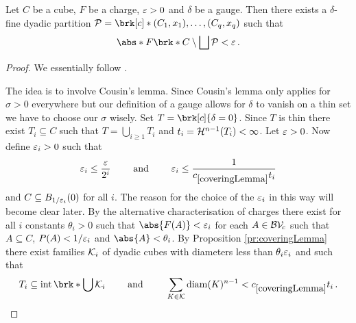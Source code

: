 \begin{lemma}\label{le:DisjointCube}
Let $C$ be a cube, $F$ be a charge, $\varepsilon>0$ and $\delta$ be a gauge. Then there exists a $\delta$-fine dyadic partition $\cP=\brk[c]*{(C_1,x_1),\dots,(C_q,x_q)}$ such that
\begin{align*}
	\abs*{F\brk*{C\setminus\bigsqcup\cP}}<\e\,.
\end{align*}
\end{lemma}
\begin{proof}

We essentially follow \cite[Lemma 2.6.4]{Pfe2001}.

The idea is to involve Cousin's lemma. Since Cousin's lemma only applies for $\sigma>0$ everywhere but our definition of a gauge allows for $\delta$ to vanish on a thin set we have to choose our $\sigma$ wisely.
Set $T=\brk[c]{\delta=0}$. Since $T$ is thin there exist $T_i\subseteq C$ such that $T=\bigcup_{i\geq1}T_i$ and $t_i=\mathcal{H}^{n-1}(T_i)<\infty$.
Let $\varepsilon>0$. 
Now define $\varepsilon_i>0$ such that
\begin{align*}
	\e_i\leq \frac{\e}{2^i}\qquad\text{ and }\qquad\e_i\leq \frac{1}{\useconstant{coveringLemma}t_i}
\end{align*}
and $C\subseteq B_{1/\varepsilon_i}(0)$ for all $i$. The reason for the choice of the $\varepsilon_i$ in this way will become clear later.
By the alternative characterisation of charges there exist for all $i$ constants $\theta_i>0$ such that $\abs{F(A)}<\e_i$ for each $A\in\mathcal{BV\!}_c$ such that $A\subseteq C$, $P(A)<1/\varepsilon_i$ and $\abs{A}<\theta_i$.
By Proposition \ref{pr:coveringLemma} there exist families $\mathcal{K}_i$ of dyadic cubes with diameters less than $\theta_i\varepsilon_i$ and such that
\begin{align*}
	T_i\subseteq \interior\brk*{\bigcup\cK_i}
	\qquad\text{ and }\qquad
	\sum_{K\in\cK}\diam(K)^{n-1}<\useconstant{coveringLemma} t_i\,.
\end{align*}


\end{proof}
